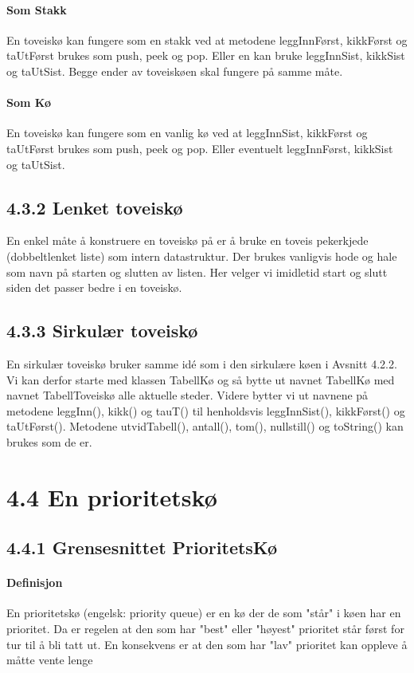 \documentclass[11pt]{article}
\begin{document}
        \paragraph{Som Stakk}
        En toveiskø kan fungere som en stakk ved at metodene leggInnFørst, kikkFørst og
        taUtFørst brukes som push, peek og pop. Eller en kan bruke leggInnSist, kikkSist og taUtSist.
        Begge ender av toveiskøen skal fungere på samme måte.
            
        \paragraph{Som Kø}
        En toveiskø kan fungere som en vanlig kø ved at leggInnSist, kikkFørst og taUtFørst
        brukes som push, peek og pop. Eller eventuelt leggInnFørst, kikkSist og taUtSist.

    \subsection{4.3.2 Lenket toveiskø}
        En enkel måte å konstruere en toveiskø på er å bruke en toveis pekerkjede (dobbeltlenket
        liste) som intern datastruktur. Der brukes vanligvis hode og hale som navn på starten og
        slutten av listen. Her velger vi imidletid start og slutt siden det passer bedre i en toveiskø. 

    \subsection{4.3.3 Sirkulær toveiskø}
        En sirkulær toveiskø bruker samme idé som i den sirkulære køen i Avsnitt 4.2.2. Vi kan derfor
        starte med klassen TabellKø og så bytte ut navnet TabellKø med navnet TabellToveiskø
        alle aktuelle steder. Videre bytter vi ut navnene på metodene leggInn(), kikk() og tauT()
        til henholdsvis leggInnSist(), kikkFørst() og taUtFørst(). Metodene utvidTabell(),
        antall(), tom(), nullstill() og toString() kan brukes som de er.


\section{4.4 En prioritetskø}
    \subsection{4.4.1 Grensesnittet PrioritetsKø}

        \paragraph{Definisjon}
        En prioritetskø (engelsk: priority queue) er en kø der de som "står" i
        køen har en prioritet. Da er regelen at den som har "best" eller
        "høyest" prioritet står først for tur til å bli tatt ut. En konsekvens er at
        den som har "lav" prioritet kan oppleve å måtte vente lenge
\end{document}
